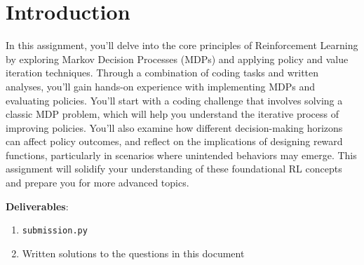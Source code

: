 \section{Introduction}

In this assignment, you'll delve into the core principles of Reinforcement Learning by exploring Markov Decision Processes (MDPs) 
and applying policy and value iteration techniques. Through a combination of coding tasks and written analyses, you'll gain 
hands-on experience with implementing MDPs and evaluating policies. You'll start with a coding challenge that involves solving a 
classic MDP problem, which will help you understand the iterative process of improving policies. You'll also examine how 
different decision-making horizons can affect policy outcomes, and reflect on the implications of designing reward functions, 
particularly in scenarios where unintended behaviors may emerge. This assignment will solidify your understanding of 
these foundational RL concepts and prepare you for more advanced topics.

\textbf{Deliverables}:
\begin{enumerate}[(1)]
    \item \texttt{submission.py}
    \item Written solutions to the questions in this document
\end{enumerate}